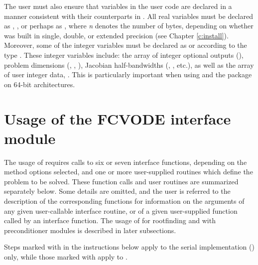 The user must also ensure that variables in the user {\F} code are
declared in a manner consistent with their counterparts in {\cvode}.
All real variables must be declared as , ,
or perhaps as , where {\em n} denotes the number of bytes,
depending on whether {\cvode} was built in single, double, or extended precision 
(see Chapter \ref{c:install}). Moreover, some of the {\F} integer variables
must be declared as  or  according to the 
{\C} type . These integer variables include: the array
of integer optional outputs (), problem dimensions (,
, ), Jacobian half-bandwidths (, ,
etc.), as well as the array of user integer data, .
This is particularly important when using {\cvode} and the {\fcvode} package 
on 64-bit architectures.


\section{Usage of the FCVODE interface module}\label{ss:fcvode_usage}

The usage of {\fcvode} requires calls to six or seven interface
functions, depending on the method options selected, and one or more
user-supplied routines which define the problem to be solved.  These
function calls and user routines are summarized separately below.
Some details are omitted, and the user is referred to the description
of the corresponding {\cvode} functions for information on the arguments 
of any given user-callable interface routine, or of a given user-supplied 
function called by an interface function.
The usage of {\fcvode} for rootfinding and with preconditioner modules is
described in later subsections.

Steps marked with {\s} in the instructions below apply to the serial
{\nvector} implementation ({\nvecs}) only, while those marked with {\p}
apply to {\nvecp}.

